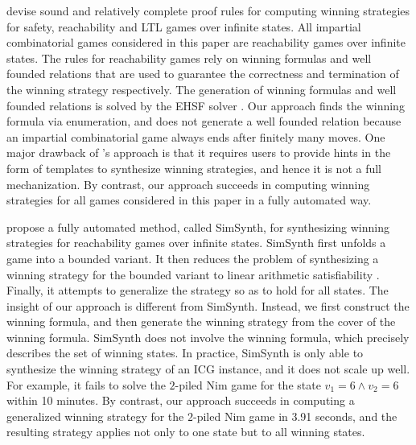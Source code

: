 \documentclass[review]{elsarticle}
\begin{document}
\citet{BeyCPR2014} devise sound and relatively complete proof rules for computing winning strategies for safety, reachability and LTL games over infinite states.
All impartial combinatorial games considered in this paper are reachability games over infinite states.
The rules for reachability games rely on winning formulas and well founded relations that are used to guarantee the correctness and termination of the winning strategy respectively.
The generation of winning formulas and well founded relations is solved by the EHSF solver \cite{BeyPR2013}.
Our approach finds the winning formula via enumeration, and does not generate a well founded relation because an impartial combinatorial game always ends after finitely many moves.
One major drawback of \citeauthor{BeyCPR2014}'s approach is that it requires users to provide hints in the form of templates to synthesize winning strategies, and hence it is not a full mechanization.
By contrast, our approach succeeds in computing winning strategies for all games considered in this paper in a fully automated way.

\citet{FarK2018} propose a fully automated method, called SimSynth, for synthesizing winning strategies for reachability games over infinite states.
SimSynth first unfolds a game into a bounded variant.
It then reduces the problem of synthesizing a winning strategy for the bounded variant to linear arithmetic satisfiability \cite{FarK2016}.
Finally, it attempts to generalize the strategy so as to hold for all states.
The insight of our approach is different from SimSynth.
Instead, we first construct the winning formula, and then generate the winning strategy from the cover of the winning formula.
SimSynth does not involve the winning formula, which precisely describes the set of winning states.
In practice, SimSynth is only able to synthesize the winning strategy of an ICG instance, and it does not scale up well.
For example, it fails to solve the $2$-piled Nim game for the state $v_1 = 6 \land v_2 = 6$ within 10 minutes.
By contrast, our approach succeeds in computing a generalized winning strategy for the $2$-piled Nim game in 3.91 seconds, and the resulting strategy applies not only to one state but to all winning states.
\end{document}
